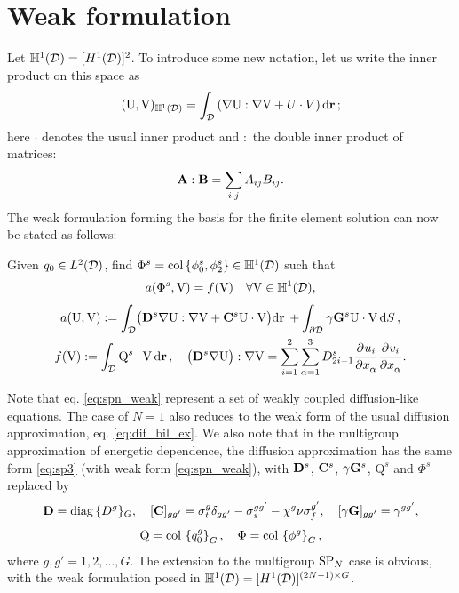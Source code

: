 \vspace{4em}
\section{Weak formulation}\label{sec:sp3_weak}
Let $\mathbb{H}^1(\VV) =
[H^1(\VV)]^2$. To introduce some new notation, let us write the inner product on this space as
\begin{equation}\label{eq:ipHH1}
	(\mathrm{U}, \mathrm{V})_{\mathbb{H}^1(\VV)} = \int_{\VV}\left(\nabla\mathrm{U} : \nabla\mathrm{V} + U\cdot
	V\right)\d{\br};
\end{equation}
here $\cdot$ denotes the usual inner product and $:$ the double inner product of matrices:
\begin{equation}\label{eq:doubleprod}
	\mat{A} : \mat{B} = \sum_{i,j}A_{ij}B_{ij}.
\end{equation}
The weak formulation forming the basis for the finite
element solution can now be stated as follows:
\begin{problem}\label{prb:sp3}
Given $q_0 \in \Lp[2](\VV)$, find $\Phi^s = \col \{\phi^s_0, \phi^s_2\} \in \mathbb{H}^1(\VV)$ such that
\begin{equation}\label{eq:spn_weak}
\begin{gathered}
	a(\Phi^s, \mathrm{V}) = f(\mathrm{V}) \quad \forall \mathrm{V}\in \mathbb{H}^1(\VV),\\[.3em]
	a(\mathrm{U}, \mathrm{V}) := \int_{\VV} \bigl(\mat{D}^s\nabla\mathrm{U} : \nabla \mathrm{V} +
	\mat{C}^s \mathrm{U}\cdot\mathrm{V}\bigr)\d{\br} +  \int_{\pV} \gamma\mat{G}^s\mathrm{U}\cdot\mathrm{V}
	\,\d{S},\\
 	f(\mathrm{V}) := \int_{\VV}\mathrm{Q}^s\cdot\mathrm{V}\,\d{\br},\quad \bigl(\mat{D}^s\nabla\mathrm{U}\bigr) : \nabla
 	\mathrm{V} = \sum_{i=1}^2\sum_{\alpha=1}^3 D^s_{2i-1}\pd{u_i}{x_\alpha}\pd{v_i}{x_\alpha}.
\end{gathered} 
\end{equation}
\end{problem}

Note that eq. \eqref{eq:spn_weak} represent a set of weakly coupled diffusion-like equations. The case of $N=1$ also
reduces to the weak form of the usual diffusion approximation, eq. \eqref{eq:dif_bil_ex}. We also note that in the multigroup
approximation of energetic dependence, the diffusion approximation has the same form \eqref{eq:sp3} (with weak form
\eqref{eq:spn_weak}), with $\mat{D}^s$, $\mat{C}^s$, $\gamma\mat{G}^s$, $\mathrm{Q}^s$ and $\Phi^s$ replaced by 
\begin{equation}\label{eq:dif_mat}
\begin{gathered}
	\mat{D} = \diag\{D^g\}_G,\quad
	[\mat{C}]_{gg'} = \sigma_t^g \delta_{gg'} - \sigma_{s}^{gg'} - \chi^g\nu\sigma_f^{g'}, \quad
	[\gamma\mat{G}]_{gg'} = \gamma^{gg'},\\[.3em] 
	\mathrm{Q} = \colset{q_0^g}{G},\quad \Phi = \colset{\phi^g}{G},
\end{gathered}
\end{equation}
where $g,g' = 1,2,\ldots,G$. The extension to the multigroup $\SPN$ case is obvious, with the weak formulation posed in 
$\mathbb{H}^1(\VV) = [H^1(\VV)]^{(2N-1)\times G}$.

